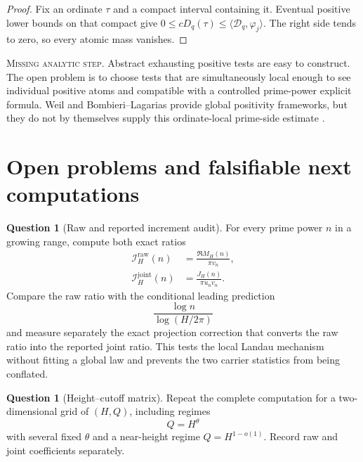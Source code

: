 \documentclass[11pt]{amsart}
\numberwithin{equation}{section}
\theoremstyle{plain}
\theoremstyle{definition}
\newtheorem{question}[theorem]{Question}
\theoremstyle{remark}
\newcommand{\1}{\mathbf{1}}
\newcommand{\missingnote}[1]{%
  \par\smallskip\noindent
  \begingroup\footnotesize\textsc{Missing analytic step.} #1\endgroup
  \par\smallskip}
\begin{document}
\begin{proof}
Fix an ordinate $\tau$ and a compact interval containing it.  Eventual
positive lower bounds on that compact give
$0\leq cD_q(\tau)\leq\langle\mathcal D_q,\varphi_j\rangle$.  The right side
tends to zero, so every atomic mass vanishes.
\end{proof}

\missingnote{Abstract exhausting positive tests are easy to construct.  The
open problem is to choose tests that are simultaneously local enough to see
individual positive atoms and compatible with a controlled prime-power
explicit formula.  Weil and Bombieri--Lagarias provide global positivity
frameworks, but they do not by themselves supply this ordinate-local
prime-side estimate \cite{Weil1952,BombieriLagarias1999}.}

\section{Open problems and falsifiable next computations}
\label{sec:open_problems}

\begin{question}[Raw and reported increment audit]
\label{question:increment_audit}
For every prime power \(n\) in a growing range, compute both exact ratios
\begin{align}
\mathcal I_H^{\mathrm{raw}}(n)
&=
\frac{\Re M_H(n)}{\pi v_n},
\label{eq:increment_audit_ratio}
\\
\mathcal I_H^{\mathrm{joint}}(n)
&=
\frac{J_H(n)}{\pi u_nv_n}.
\label{eq:joint_increment_audit_ratio}
\end{align}
Compare the raw ratio with the conditional leading prediction
\begin{equation}
\frac{\log n}{\log(H/2\pi)}
\label{eq:increment_audit_prediction}
\end{equation}
and measure separately the exact projection correction that converts the
raw ratio into the reported joint ratio.  This tests the local Landau
mechanism without fitting a global law and prevents the two carrier
statistics from being conflated.
\end{question}

\begin{question}[Height--cutoff matrix]
\label{question:height_cutoff_matrix}
Repeat the complete computation for a two-dimensional grid of
\((H,Q)\), including regimes
\begin{equation}
Q=H^\theta
\label{eq:height_cutoff_regime}
\end{equation}
with several fixed \(\theta\) and a near-height regime
\(Q=H^{1-o(1)}\).  Record raw and joint coefficients separately.
\end{question}
\end{document}
